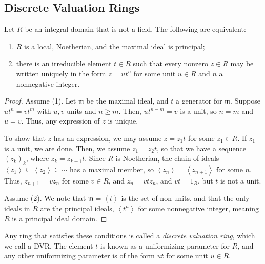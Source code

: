 \documentclass[10pt]{mypackage}
\begin{document}
\subsection{Discrete Valuation Rings}%
\begin{proposition}
  Let $R$ be an integral domain that is not a field. The following are equivalent:
  \begin{enumerate}[(1)]
    \item $R$ is a local, Noetherian, and the maximal ideal is principal;
    \item there is an irreducible element $t\in R$ such that every nonzero $z\in R$ may be written uniquely in the form $z = ut^{n}$ for some unit $u\in R$ and $n$ a nonnegative integer.
  \end{enumerate}
\end{proposition}
\begin{proof}
  Assume (1). Let $\mathfrak{m}$ be the maximal ideal, and $t$ a generator for $\mathfrak{m}$. Suppose $ut^{n} = vt^{m}$ with $u,v$ units and $n\geq m$. Then, $ut^{n-m} = v$ is a unit, so $n = m$ and $u = v$. Thus, any expression of $z$ is unique.\newline

  To show that $z$ has an expression, we may assume $z = z_1 t$ for some $z_1\in R$. If $z_1$ is a unit, we are done. Then, we assume $z_1 = z_2 t$, so that we have a sequence $\left( z_k \right)_k$, where $z_{k} = z_{k+1}t$. Since $R$ is Noetherian, the chain of ideals $\left\langle z_1 \right\rangle\subseteq \left\langle z_2 \right\rangle\subseteq \cdots$ has a maximal member, so $\left\langle z_n \right\rangle = \left\langle z_{n+1} \right\rangle$ for some $n$. Thus, $z_{n+1} = vz_n$ for some $v\in R$, and $z_n = vtz_n$, and $vt = 1_R$, but $t$ is not a unit.\newline

  Assume (2). We note that $\mathfrak{m}= \left\langle t \right\rangle$ is the set of non-units, and that the only ideals in $R$ are the principal ideals, $\left\langle t^n \right\rangle$ for some nonnegative integer, meaning $R$ is a principal ideal domain.
\end{proof}
Any ring that satisfies these conditions is called a \textit{discrete valuation ring}, which we call a DVR. The element $t$ is known as a uniformizing parameter for $R$, and any other uniformizing parameter is of the form $ut$ for some unit $u\in R$.\newline
\end{document}
